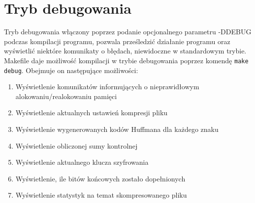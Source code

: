 \documentclass[]{article}
\begin{document}
\section{Tryb debugowania}\label{header-n281}
Tryb debugowania włączony poprzez podanie opcjonalnego parametru -DDEBUG podczas kompilacji programu, pozwala prześledzić działanie programu oraz wyświetlić niektóre komunikaty o błędach, niewidoczne w standardowym trybie. Makefile daje możliwość kompilacji w trybie debugowania poprzez komendę \texttt{make debug}. Obejmuje on następujące możliwości:

\begin{enumerate}
\def\labelenumi{\arabic{enumi}.}
\item
Wyświetlenie komunikatów informujących o nieprawidłowym alokowaniu/realokowaniu pamięci
\item
Wyświetlenie aktualnych ustawień kompresji pliku
\item
Wyświetlenie wygenerowanych kodów Huffmana dla każdego znaku
\item
Wyświetlenie obliczonej sumy kontrolnej
\item
Wyświetlenie aktualnego klucza szyfrowania
\item
Wyświetlenie, ile bitów końcowych zostało dopełnionych
\item
Wyświetlenie statystyk na temat skompresowanego pliku

\end{enumerate}
\end{document}
